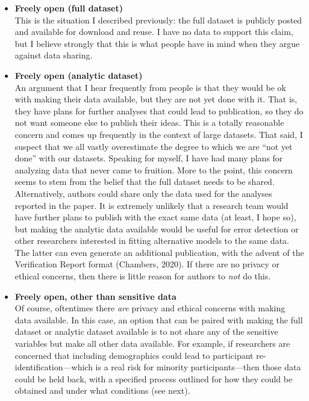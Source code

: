 \documentclass[authordate, empirical,issue]{jote-new-article}
\begin{document}
\begin{itemize}
  \item \textbf{Freely open (full dataset)}\\
        This is the situation I described previously: the full dataset is publicly posted and available for download and reuse. I have no data to support this claim, but I believe strongly that this is what people have in mind when they argue against data sharing.

















  \item  \textbf{Freely open (analytic dataset)}\\
        An argument that I hear frequently from people is that they would be ok with making their data available, but they are not yet done with it. That is, they have plans for further analyses that could lead to publication, so they do not want someone else to publish their ideas. This is a totally reasonable concern and comes up frequently in the context of large datasets. That said, I suspect that we all vastly overestimate the degree to which we are “not yet done” with our datasets. Speaking for myself, I have had many plans for analyzing data that never came to fruition. More to the point, this concern seems to stem from the belief that the full dataset needs to be shared. Alternatively, authors could share only the data used for the analyses reported in the paper. It is extremely unlikely that a research team would have further plans to publish with the exact same data (at least, I hope so), but making the analytic data available would be useful for error detection or other researchers interested in fitting alternative models to the same data. The latter can even generate an additional publication, with the advent of the Verification Report format (Chambers, 2020). If there are no privacy or ethical concerns, then there is little reason for authors to \emph{not} do this.







  \item \textbf{Freely open, other than sensitive data}\\
        Of course, oftentimes there \emph{are} privacy and ethical concerns with making data available. In this case, an option that can be paired with making the full dataset or analytic dataset available is to not share any of the sensitive variables but make all other data available. For example, if researchers are concerned that including demographics could lead to participant re-identification—which is a real risk for minority participants—then those data could be held back, with a specified process outlined for how they could be obtained and under what conditions (see next).








\end{itemize}
\end{document}
